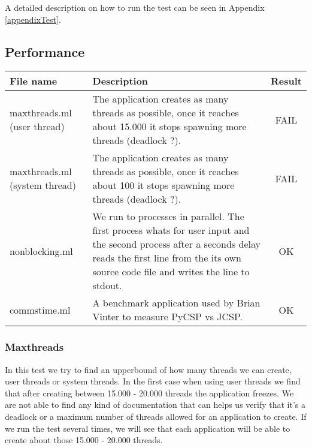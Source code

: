 \documentclass[a4paper,12pt]{article}
\begin{document}
A detailed description on how to run the test can be seen in
Appendix \ref{appendixTest}.

\subsection{Performance}

\begin{tabular}{|p{3cm}|p{8.5cm}|c|}
    \hline
    	File name &
	Description &
	Result \\
    \hline
    	maxthreads.ml (user thread) &
        The application creates as many threads as possible, once it reaches
        about 15.000 it stops spawning more threads (deadlock ?).&
	FAIL \\
    \hline
    	maxthreads.ml (system thread) &
        The application creates as many threads as possible, once it reaches
        about 100 it stops spawning more threads (deadlock ?).&
	FAIL \\
    \hline
    	nonblocking.ml &
        We run to processes in parallel. The first process whats for user input
        and the second process after a seconds delay reads the first line from
        the its own source code file and writes the line to stdout.&
	OK \\
    \hline
    	commstime.ml &
        A benchmark application used by Brian Vinter to measure PyCSP vs JCSP.&
	OK \\
    \hline
  \end{tabular} 

\subsubsection*{Maxthreads}
In this test we try to find an upperbound of how many threads we can create,
user threads or system threads. In the first case when using user threads we
find that after creating between 15.000 - 20.000 threads the application
freezes. We are not able to find any kind of documentation that can helps us
verify that it's a deadlock or a maximum number of threads allowed for an
application to create. If we run the test several times, we will see that
each application will be able to create about those 15.000 - 20.000 threads.
\end{document}
